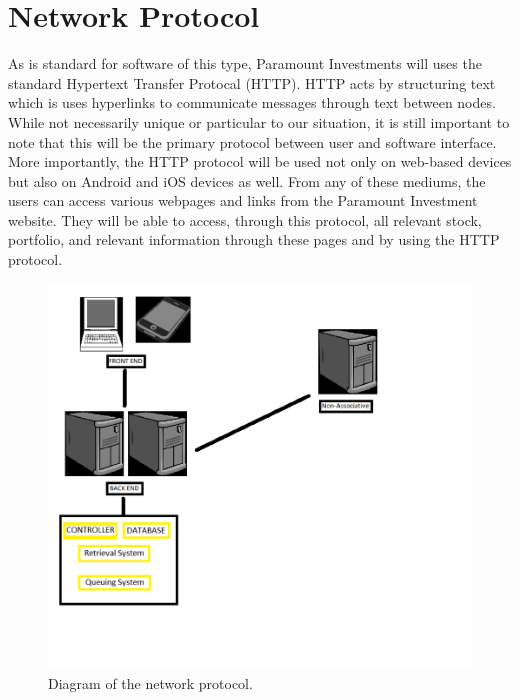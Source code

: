 \section{Network Protocol}

As is standard for software of this type, Paramount Investments
will uses the standard Hypertext Transfer Protocal (HTTP). HTTP
acts by structuring text which is uses hyperlinks to communicate
messages through text between nodes. While not necessarily unique
or particular to our situation, it is still important to note that
this will be the primary protocol between user and software
interface. More importantly, the HTTP protocol will be used not
only on web-based devices but also on Android and iOS devices as
well. From any of these mediums, the users can access various
webpages and links from the Paramount Investment website. They will
be able to access, through this protocol, all relevant stock,
portfolio, and relevant information through these pages and by
using the HTTP protocol.

\begin{figure}[h]
\centering
\includegraphics[width=7in]{./img/protocol.png}
\caption{Diagram of the network protocol.}
\end{figure}
